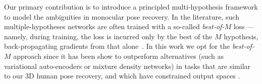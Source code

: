\begin{figure}
\setlength{\fboxsep}{0pt}%
\setlength{\fboxrule}{0pt}%
\vspace{-0.2cm}
\end{figure}

Our primary contribution is to introduce a principled multi-hypothesis framework to model the ambiguities in monocular pose recovery.
In the literature, such multiple-hypotheses networks are often trained with a so-called \emph{best-of-$M$} loss --- namely, during training, the loss is incurred only by the best of the $M$ hypothesis, back-propagating gradients from that alone~\cite{guzman2012multiple}.
In this work we opt for the \emph{best-of-$M$} approach since it has been show to outperform  alternatives (such as variational auto-encoders or mixture density networks) in tasks that are similar to our 3D human pose recovery, and which have constrained output spaces \cite{rupprecht17learning}.

